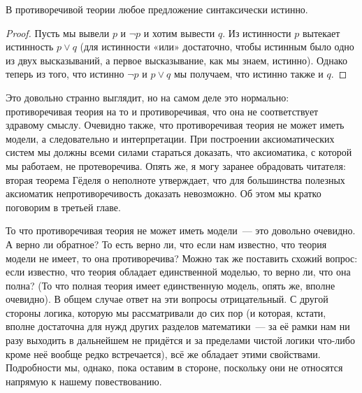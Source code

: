 \begin{thm}
В противоречивой теории любое предложение синтаксически истинно.
\end{thm}
\begin{proof}
Пусть мы вывели $p$ и $\neg p$ и хотим вывести $q$. Из истинности $p$ вытекает истинность $p\lor q$ (для истинности «или» достаточно, чтобы истинным было одно из двух высказываний, а первое высказывание, как мы знаем, истинно). Однако теперь из того, что истинно $\neg p$ и $p\lor q$ мы получаем, что истинно также и $q$.
\end{proof}

Это довольно странно выглядит, но на самом деле это нормально: противоречивая теория на то и противоречивая, что она не соответствует здравому смыслу. Очевидно также, что противоречивая теория не может иметь модели, а следовательно и интерпретации. При построении аксиоматических систем мы должны всеми силами стараться доказать, что аксиоматика, с которой мы работаем, не протеворечива. Опять же, я могу заранее обрадовать читателя: вторая теорема Гёделя о неполноте утверждает, что для большинства полезных аксиоматик непротиворечивость доказать невозможно. Об этом мы кратко поговорим в третьей главе.

То что противоречивая теория не может иметь модели~— это довольно очевидно. А верно ли обратное? То есть верно ли, что если нам известно, что теория модели не имеет, то она противоречива? Можно так же поставить схожий вопрос: если известно, что теория обладает единственной моделью, то верно ли, что она полна? (То что полная теория имеет единственную модель, опять же, вполне очевидно). В общем случае ответ на эти вопросы отрицательный. С другой стороны логика, которую мы рассматривали до сих пор (и которая, кстати, вполне достаточна для нужд других разделов математики~— за её рамки нам ни разу выходить в дальнейшем не придётся и за пределами чистой логики что-либо кроме неё вообще редко встречается), всё же обладает этими свойствами. Подробности мы, однако, пока оставим в стороне, поскольку они не относятся напрямую к нашему повествованию.
